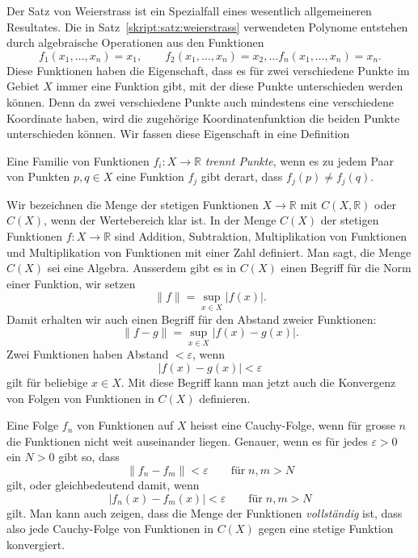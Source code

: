 Der Satz von Weierstrass ist ein Spezialfall eines wesentlich allgemeineren
Resultates.
Die in Satz~\ref{skript:satz:weierstrass} verwendeten Polynome entstehen
durch algebraische Operationen aus den Funktionen
\[
f_1(x_1,\dots,x_n)=x_1,\qquad
f_2(x_1,\dots,x_n)=x_2,\dots
f_n(x_1,\dots,x_n)=x_n.
\]
Diese Funktionen haben die Eigenschaft, dass es für zwei verschiedene
Punkte im Gebiet $X$ immer eine Funktion gibt, mit der diese Punkte
unterschieden werden können.
Denn da zwei verschiedene Punkte auch mindestens eine verschiedene
Koordinate haben, wird die zugehörige Koordinatenfunktion die beiden
Punkte unterschieden können.
Wir fassen diese Eigenschaft in eine Definition
\begin{definition}
Eine Familie von Funktionen $f_i\colon X\to \mathbb R$ {\em trennt Punkte},
wenn es zu jedem Paar von Punkten $p,q\in X$ eine Funktion $f_j$ gibt derart,
dass $f_j(p)\ne f_j(q)$.
\end{definition}

Wir bezeichnen die Menge der stetigen Funktionen $X\to\mathbb R$
mit $C(X,\mathbb R)$ oder $C(X)$, wenn der Wertebereich klar ist.
In der Menge $C(X)$ der stetigen Funktionen $f\colon X\to\mathbb R$ sind
Addition, Subtraktion, Multiplikation von Funktionen und Multiplikation
von Funktionen mit einer Zahl definiert.
Man sagt, die Menge $C(X)$ sei eine Algebra.
Ausserdem gibt es in $C(X)$ einen Begriff für die Norm einer Funktion,
wir setzen
\begin{equation}
\| f\| = \sup_{x\in X}|f(x)|.
\label{skript:multipol:supremum-norm}
\end{equation}
Damit erhalten wir auch einen Begriff für den Abstand zweier Funktionen:
\[
\|f-g\| = \sup_{x\in X}|f(x)-g(x)|.
\]
Zwei Funktionen haben Abstand $< \varepsilon$, wenn
\[
|f(x)-g(x)| < \varepsilon
\]
gilt für beliebige $x\in X$.
Mit diese Begriff kann man jetzt auch die Konvergenz von Folgen von
Funktionen in $C(X)$ definieren.

Eine Folge $f_n$ von Funktionen auf $X$ heisst eine Cauchy-Folge, wenn 
für grosse $n$ die Funktionen nicht weit auseinander liegen.
Genauer, wenn es für jedes $\varepsilon>0$ ein $N>0$ gibt so, dass
\[
\|f_n-f_m\| < \varepsilon \qquad\text{für}\; n,m>N
\]
gilt, oder gleichbedeutend damit, wenn
\[
|f_n(x)-f_m(x)|<\varepsilon\qquad\text{für}\; n,m>N
\]
gilt.
Man kann auch zeigen, dass die Menge der Funktionen {\em vollständig} ist,
dass also jede Cauchy-Folge von Funktionen in $C(X)$ gegen eine stetige
Funktion konvergiert.

